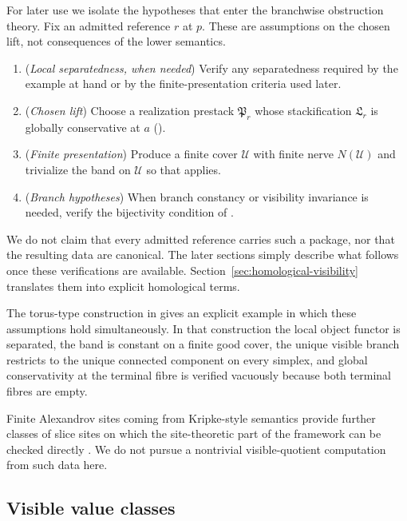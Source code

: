 For later use we isolate the hypotheses that enter the branchwise obstruction theory. Fix an admitted reference $r$ at $p$. These are assumptions on the chosen lift, not consequences of the lower semantics.
\begin{enumerate}[label=(\arabic*),nosep,leftmargin=*]
\item (\emph{Local separatedness, when needed}) Verify any separatedness required by the example at hand or by the finite-presentation criteria used later.
\item (\emph{Chosen lift}) Choose a realization prestack $\mathfrak P_r$ whose stackification $\mathfrak L_r$ is globally conservative at $a$ ().
\item (\emph{Finite presentation}) Produce a finite cover $\mathcal U$ with finite nerve $N(\mathcal U)$ and trivialize the band on $\mathcal U$ so that  applies.
\item (\emph{Branch hypotheses}) When branch constancy or visibility invariance is needed, verify the bijectivity condition of .
\end{enumerate}
We do not claim that every admitted reference carries such a package, nor that the resulting data are canonical. The later sections simply describe what follows once these verifications are available. Section~\ref{sec:homological-visibility} translates them into explicit homological terms.

The torus-type construction in  gives an explicit example in which these assumptions hold simultaneously. In that construction the local object functor is separated, the band is constant on a finite good cover, the unique visible branch restricts to the unique connected component on every simplex, and global conservativity at the terminal fibre is verified vacuously because both terminal fibres are empty.

Finite Alexandrov sites coming from Kripke-style semantics provide further classes of slice sites on which the site-theoretic part of the framework can be checked directly \cite{Beth1956,Kripke1965}. We do not pursue a nontrivial visible-quotient computation from such data here.

\subsection{Visible value classes}

